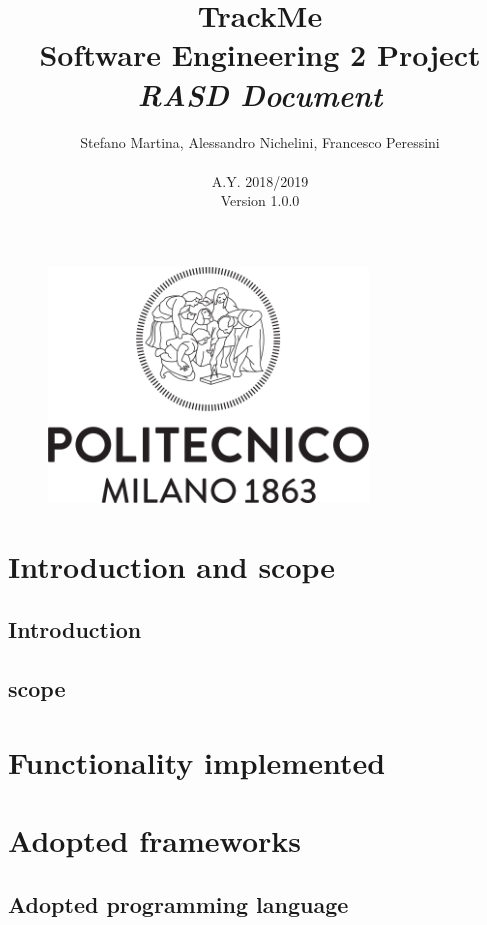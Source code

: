\documentclass{article}
\begin{document}
\begin{figure}[t]
\centering
	\includegraphics[height=6.25cm,keepaspectratio]{Figures/logo}
\end{figure}

\title{TrackMe \\ Software Engineering 2 Project\\ \textit{RASD Document} }
\author{Stefano Martina, Alessandro Nichelini, Francesco Peressini
		\\ \\ A.Y. 2018/2019 \\ Version 1.0.0}
		
\maketitle
\newpage

\tableofcontents
\newpage

\section{Introduction and scope}
\subsection{Introduction}
\subsection{scope}

\section{Functionality implemented}

\section{Adopted frameworks}
\subsection{Adopted programming language}
\end{document}
